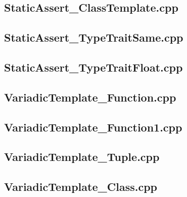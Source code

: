 \documentclass[11pt]{report}
\begin{document}
\begin{appendix}
\subsection{StaticAssert\_ClassTemplate.cpp}
\label{StaticAssert_ClassTemplate}


\subsection{StaticAssert\_TypeTraitSame.cpp}
\label{StaticAssert_TypeTraitSame}


\subsection{StaticAssert\_TypeTraitFloat.cpp}
\label{StaticAssert_TypeTraitFloat}


\subsection{VariadicTemplate\_Function.cpp}
\label{VariadicTemplate_Function}


\subsection{VariadicTemplate\_Function1.cpp}
\label{VariadicTemplate_Function1}


\subsection{VariadicTemplate\_Tuple.cpp}
\label{VariadicTemplate_Tuple}


\subsection{VariadicTemplate\_Class.cpp}
\label{VariadicTemplate_Class}



\end{appendix}
\end{document}
